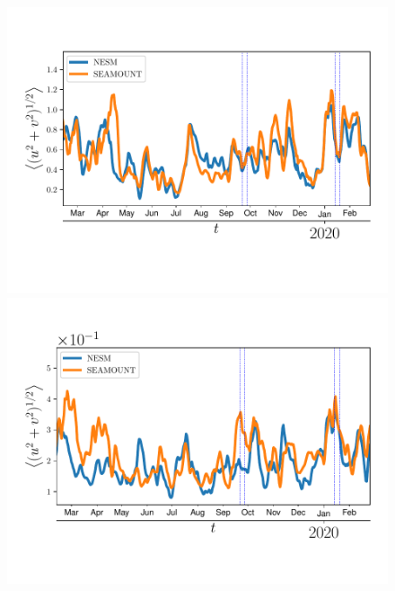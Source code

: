 \documentclass[varwidth]{standalone}
\begin{document}
\begin{figure}
\hspace{-1mm}
\hspace{-2mm}
\includegraphics[scale=0.3]{../avg_velo_vlevel_-100.pdf}
\hspace{-3mm}
\hspace{-2mm}
\includegraphics[scale=0.3]{../avg_velo_vlevel_-4500.pdf} 
\hspace{-2mm}
\end{figure}


\end{document}
